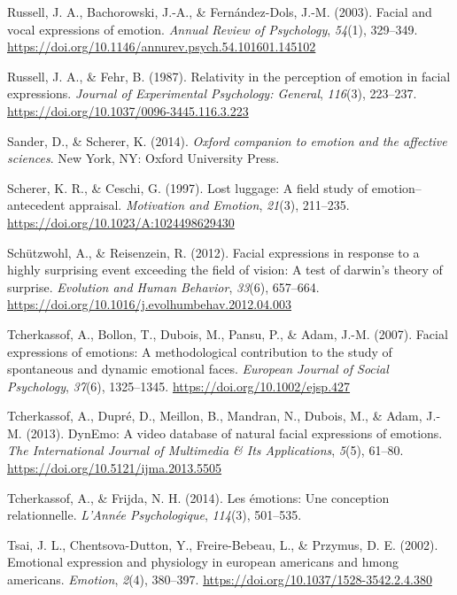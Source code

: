 \documentclass[
  english,
  doc]{apa7}
\newlength{\cslhangindent}
\newenvironment{cslreferences}%
  {\setlength{\parindent}{0pt}%
  \everypar{\setlength{\hangindent}{\cslhangindent}}\ignorespaces}%
  {\par}
\begin{document}
\begin{cslreferences}
\leavevmode\hypertarget{ref-russell2003facial}{}%
Russell, J. A., Bachorowski, J.-A., \& Fernández-Dols, J.-M. (2003). Facial and vocal expressions of emotion. \emph{Annual Review of Psychology}, \emph{54}(1), 329--349. \url{https://doi.org/10.1146/annurev.psych.54.101601.145102}

\leavevmode\hypertarget{ref-russell1987relativity}{}%
Russell, J. A., \& Fehr, B. (1987). Relativity in the perception of emotion in facial expressions. \emph{Journal of Experimental Psychology: General}, \emph{116}(3), 223--237. \url{https://doi.org/10.1037/0096-3445.116.3.223}

\leavevmode\hypertarget{ref-sander2014oxford}{}%
Sander, D., \& Scherer, K. (2014). \emph{Oxford companion to emotion and the affective sciences}. New York, NY: Oxford University Press.

\leavevmode\hypertarget{ref-scherer1997lost}{}%
Scherer, K. R., \& Ceschi, G. (1997). Lost luggage: A field study of emotion--antecedent appraisal. \emph{Motivation and Emotion}, \emph{21}(3), 211--235. \url{https://doi.org/10.1023/A:1024498629430}

\leavevmode\hypertarget{ref-schutzwohl2012facial}{}%
Schützwohl, A., \& Reisenzein, R. (2012). Facial expressions in response to a highly surprising event exceeding the field of vision: A test of darwin's theory of surprise. \emph{Evolution and Human Behavior}, \emph{33}(6), 657--664. \url{https://doi.org/10.1016/j.evolhumbehav.2012.04.003}

\leavevmode\hypertarget{ref-tcherkassof2007facial}{}%
Tcherkassof, A., Bollon, T., Dubois, M., Pansu, P., \& Adam, J.-M. (2007). Facial expressions of emotions: A methodological contribution to the study of spontaneous and dynamic emotional faces. \emph{European Journal of Social Psychology}, \emph{37}(6), 1325--1345. \url{https://doi.org/10.1002/ejsp.427}

\leavevmode\hypertarget{ref-tcherkassof2013dynemo}{}%
Tcherkassof, A., Dupré, D., Meillon, B., Mandran, N., Dubois, M., \& Adam, J.-M. (2013). DynEmo: A video database of natural facial expressions of emotions. \emph{The International Journal of Multimedia \& Its Applications}, \emph{5}(5), 61--80. \url{https://doi.org/10.5121/ijma.2013.5505}

\leavevmode\hypertarget{ref-tcherkassof2014emotions}{}%
Tcherkassof, A., \& Frijda, N. H. (2014). Les émotions: Une conception relationnelle. \emph{L'Année Psychologique}, \emph{114}(3), 501--535.

\leavevmode\hypertarget{ref-tsai2002emotional}{}%
Tsai, J. L., Chentsova-Dutton, Y., Freire-Bebeau, L., \& Przymus, D. E. (2002). Emotional expression and physiology in european americans and hmong americans. \emph{Emotion}, \emph{2}(4), 380--397. \url{https://doi.org/10.1037/1528-3542.2.4.380}


\end{cslreferences}
\end{document}
